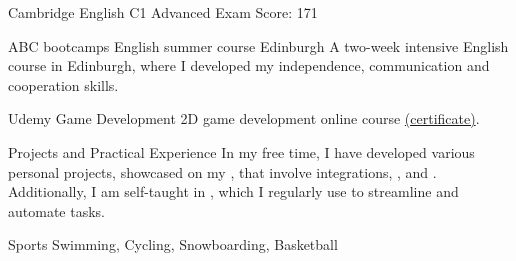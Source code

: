 \begin{leftcolumn}
        \cvmetaevent
        {Cambridge English}
        {C1 Advanced Exam}
        {}
        {Score: 171}
        
        \cvmetaevent
        {ABC bootcamps}
        {English summer course}
        {Edinburgh}
        {A two-week intensive English course in Edinburgh, where I developed my independence, communication and cooperation skills.}
        
        \cvmetaevent
        {Udemy}
        {Game Development}
        {}
        {2D game development online course \textcolor{maincol}{\href{https://udemy-certificate.s3.amazonaws.com/pdf/UC-d7553e16-cd48-4367-a447-73e2f10a2d3a.pdf}{(certificate)}}.}

    \vfill\medbreak
    
        \cvmetaevent
        {Projects and Practical Experience}
        {}
        {}
        {
            In my free time, I have developed various personal projects, showcased on my , that involve  integrations, , and .
            Additionally, I am self-taught in , which I regularly use to streamline and automate tasks.
        }
        
        \cvmetaevent
        {Sports}
        {}
        {}
        {Swimming, Cycling, Snowboarding, Basketball}


    
    \end{leftcolumn}